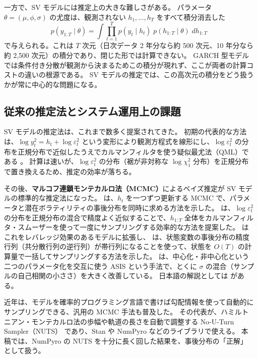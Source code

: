 一方で、SV モデルには推定上の大きな難しさがある。
パラメータ $\theta = (\mu,\phi,\sigma)$ の尤度は、観測されない $h_1,\dots,h_T$ をすべて積分消去した
\[
  p(y_{1:T} \mid \theta) = \int \prod_{t=1}^{T} p(y_t \mid h_t)\; p(h_{1:T} \mid \theta)\; dh_{1:T}
\]
で与えられる。これは $T$ 次元（日次データ 2 年分なら約 500 次元、10 年分なら約 2,500 次元）の積分であり、閉じた形では計算できない。
GARCH 型モデルでは条件付き分散が観測から決まるためこの積分が現れず、ここが両者の計算コストの違いの根源である。
SV モデルの推定では、この高次元の積分をどう扱うかが常に中心的な問題になる。

\subsection{従来の推定法とシステム運用上の課題}\label{sec:intro-mcmc}

SV モデルの推定法は、これまで数多く提案されてきた。
初期の代表的な方法は、$\log y_t^2 = h_t + \log \varepsilon_t^2$ という変形により観測方程式を線形にし、$\log \varepsilon_t^2$ の分布を正規分布で近似したうえでカルマンフィルタを使う疑似最尤法（QML）である \parencite{harvey1994}。
計算は速いが、$\log \varepsilon_t^2$ の分布（裾が非対称な $\log \chi^2_1$ 分布）を正規分布で置き換えるため、推定の効率が落ちる。

その後、\textbf{マルコフ連鎖モンテカルロ法（MCMC）}によるベイズ推定が SV モデルの標準的な推定法になった。
\textcite{jacquier1994} は、$h_t$ を一つずつ更新する MCMC で、パラメータと潜在ボラティリティの事後分布を同時に求める方法を示した。
\textcite{kim1998} は、$\log \varepsilon_t^2$ の分布を正規分布の混合で精度よく近似することで、$h_{1:T}$ 全体をカルマンフィルタ・スムーザーを使って一度にサンプリングする効率的な方法を提案した。
\textcite{omori2007} はこれをレバレッジ効果のあるモデルに拡張し、
\textcite{chan2009} は、状態変数の事後分布の精度行列（共分散行列の逆行列）が帯行列になることを使って、状態を $O(T)$ の計算量で一括してサンプリングする方法を示した。
\textcite{kastner2014} は、中心化・非中心化という二つのパラメータ化を交互に使う ASIS という手法で、とくに $\sigma$ の混合（サンプルの自己相関の小ささ）を大きく改善している。
日本語の解説としては \textcite{watanabe2000} がある。

近年は、モデルを確率的プログラミング言語で書けば勾配情報を使って自動的にサンプリングできる、汎用の MCMC 手法も普及した。
その代表が、ハミルトニアン・モンテカルロ法の歩幅や軌道の長さを自動で調整する No-U-Turn Sampler（NUTS）\parencite{hoffman2014} であり、Stan や NumPyro \parencite{phan2019} などのライブラリで使える。
本稿では、NumPyro の NUTS を十分に長く回した結果を、事後分布の「正解」として扱う。

